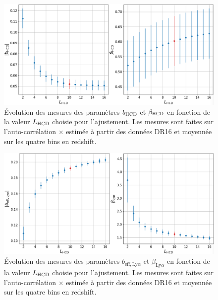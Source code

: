 \begin{figure}[h]
  \centering
  \includegraphics[scale=0.3]{bias_hcd_vs_L0_dr16}
  \caption{Évolution des mesures des paramètres $b_{\textsc{HCD}}$ et $\beta_{\textsc{HCD}}$ en fonction de la valeur $L_{\textsc{HCD}}$ choisie pour l'ajustement.
    Les mesures sont faites sur l'auto-corrélation \lya{}$\times$\lya{} estimée à partir des données DR16 et moyennée sur les quatre bins en redshift.
    }
  \label{fig:bias_hcd_vs_L0_dr16}
\end{figure}
\begin{figure}[h]
  \centering
  \includegraphics[scale=0.3]{bias_lya_vs_L0_dr16}
  \caption{Évolution des mesures des paramètres $b_{\mathrm{eff},\mathrm{Ly}\alpha}$ et $\beta_{\mathrm{Ly}\alpha}$ en fonction de la valeur $L_{\textsc{HCD}}$ choisie pour l'ajustement.
    Les mesures sont faites sur l'auto-corrélation \lya{}$\times$\lya{} estimée à partir des données DR16 et moyennée sur les quatre bins en redshift.
    }
  \label{fig:bias_lya_vs_L0_dr16}
\end{figure}


